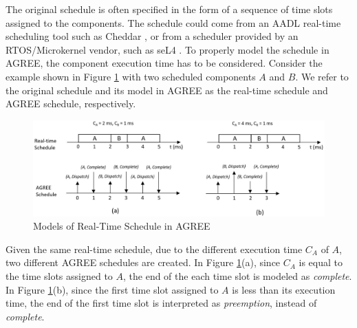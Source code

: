 The original schedule is often specified in the form of a sequence of time slots assigned to the components. 
The schedule could come from an AADL real-time scheduling tool such as Cheddar \cite{cheddar}, or from a scheduler provided by an RTOS/Microkernel vendor, such as seL4 \cite{sel4}. 
To properly model the schedule in AGREE, the component execution time has to be considered. Consider the example shown in Figure \ref{RTschedule} with two scheduled components $A$ and $B$. We refer to the original schedule and its model in AGREE as the real-time schedule and AGREE schedule, respectively.
\begin{figure}[t!]
\centering
\includegraphics[width=130mm]{RTschedule.jpg}
\caption{Models of Real-Time Schedule in AGREE\label{RTschedule}}
\end{figure}
Given the same real-time schedule, due to the different execution time $C_A$ of $A$, two different AGREE schedules are created. In Figure \ref{RTschedule}(a), since $C_A$ is equal to the time slots assigned to $A$, the end of the each time slot is modeled as \emph{complete}. In Figure \ref{RTschedule}(b), since the first time slot assigned to $A$ is less than its execution time, the end of the first time slot is interpreted as \emph{preemption}, instead of \emph{complete}.




